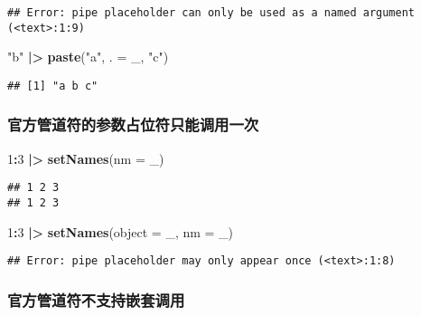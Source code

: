 \documentclass[
]{article}
\newenvironment{Shaded}{\begin{snugshade}}{\end{snugshade}}
\newcommand{\AttributeTok}[1]{\textcolor[rgb]{0.13,0.29,0.53}{#1}}
\newcommand{\DecValTok}[1]{\textcolor[rgb]{0.00,0.00,0.81}{#1}}
\newcommand{\FunctionTok}[1]{\textcolor[rgb]{0.13,0.29,0.53}{\textbf{#1}}}
\newcommand{\NormalTok}[1]{#1}
\newcommand{\SpecialCharTok}[1]{\textcolor[rgb]{0.81,0.36,0.00}{\textbf{#1}}}
\newcommand{\StringTok}[1]{\textcolor[rgb]{0.31,0.60,0.02}{#1}}
\begin{document}
\begin{verbatim}
## Error: pipe placeholder can only be used as a named argument (<text>:1:9)
\end{verbatim}

\begin{Shaded}
\begin{Highlighting}[]
\StringTok{"b"} \SpecialCharTok{|\textgreater{}}  \FunctionTok{paste}\NormalTok{(}\StringTok{"a"}\NormalTok{, }\AttributeTok{. =}\NormalTok{ \_, }\StringTok{"c"}\NormalTok{)}
\end{Highlighting}
\end{Shaded}

\begin{verbatim}
## [1] "a b c"
\end{verbatim}

\subsubsection{官方管道符的参数占位符只能调用一次}\label{ux5b98ux65b9ux7ba1ux9053ux7b26ux7684ux53c2ux6570ux5360ux4f4dux7b26ux53eaux80fdux8c03ux7528ux4e00ux6b21}

\begin{Shaded}
\begin{Highlighting}[]
\DecValTok{1}\SpecialCharTok{:}\DecValTok{3} \SpecialCharTok{|\textgreater{}} \FunctionTok{setNames}\NormalTok{(}\AttributeTok{nm =}\NormalTok{ \_)}
\end{Highlighting}
\end{Shaded}

\begin{verbatim}
## 1 2 3 
## 1 2 3
\end{verbatim}

\begin{Shaded}
\begin{Highlighting}[]
\DecValTok{1}\SpecialCharTok{:}\DecValTok{3} \SpecialCharTok{|\textgreater{}} \FunctionTok{setNames}\NormalTok{(}\AttributeTok{object =}\NormalTok{ \_, }\AttributeTok{nm =}\NormalTok{ \_)}
\end{Highlighting}
\end{Shaded}

\begin{verbatim}
## Error: pipe placeholder may only appear once (<text>:1:8)
\end{verbatim}

\subsubsection{官方管道符不支持嵌套调用}\label{ux5b98ux65b9ux7ba1ux9053ux7b26ux4e0dux652fux6301ux5d4cux5957ux8c03ux7528}
\end{document}
